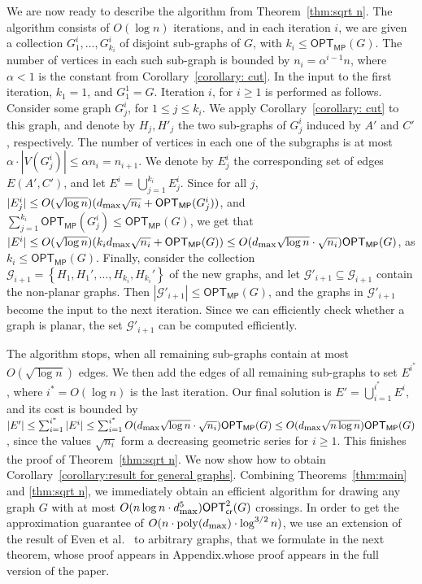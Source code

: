 \documentclass[twoside,leqno,twocolumn]{article}
\newcommand{\set}[1]{\left\{ #1 \right\}}
\newcommand{\sse}{\subseteq}
\newcommand{\gset}{{\mathcal{G}}}
\newcommand{\poly}{\operatorname{poly}}
\newcommand{\optmp}[1]{\mathsf{OPT}_{\mathsf{MP}}(#1)}
\newcommand{\optcrosq}[1]{\mathsf{OPT}^{2}_{\mathsf{cr}}(#1)}
\newcommand{\dmax}{d_{\mbox{\textup{\footnotesize{max}}}}}
\begin{document}
We are now ready to describe the algorithm from Theorem~\ref{thm:sqrt n}. The algorithm consists of $O(\log n)$ iterations, and in each iteration $i$, we are given a collection $G_1^i,\ldots,G_{k_i}^i$ of disjoint sub-graphs of $G$, with $k_i\leq \optmp{G}$. The number of vertices in each such sub-graph is bounded by $n_i=\alpha^{i-1}n$, where $\alpha<1$ is the constant from Corollary~\ref{corollary: cut}. In the input to the first iteration, $k_1=1$, and $G_1^1=G$.
Iteration $i$, for $i\geq 1$ is performed as follows. Consider some graph $G^i_j$, for $1\leq j\leq k_i$. We apply Corollary~\ref{corollary: cut} to this graph, and denote by $H_j,H'_j$ the two sub-graphs of $G^i_j$ induced by $A'$ and $C'$, respectively. The number of vertices in each one of the subgraphs is at most $\alpha\cdot |V(G^i_j)|\leq \alpha n_i=n_{i+1}$. We denote by $E^i_j$ the corresponding set of edges $E(A',C')$, and let $E^i=\bigcup_{j=1}^{k_i}E^i_j$. Since for all $j$, $|E^i_j|\leq O(\sqrt{\log n})(\dmax\sqrt {n_i}+\optmp{G^i_j})$, and $\sum_{j=1}^{k_i}\optmp{G^i_j}\leq \optmp{G}$, we get that $|E^i|\leq O(\sqrt{\log n})(k_i\dmax\sqrt{n_i}+\optmp{G})\leq O(\dmax\sqrt{\log n}\cdot \sqrt{n_i})\optmp{G}$, as $k_i\leq \optmp{G}$. Finally, consider the collection $\gset_{i+1}=\set{H_1,H_1',\ldots,H_{k_i},H_{k_i}'}$ of the new graphs, and let $\gset'_{i+1}\sse \gset_{i+1}$ contain the non-planar graphs. Then $|\gset'_{i+1}|\leq \optmp{G}$, and the graphs in $\gset'_{i+1}$ become the input to the next iteration. 
Since we can efficiently check whether a graph is planar, the set $\gset'_{i+1}$ can be computed efficiently.

The algorithm stops, when all remaining sub-graphs contain at most $O(\sqrt{\log n})$ edges. We then add the edges of all remaining sub-graphs to set $E^{i^*}$, where $i^*=O(\log n)$ is the last iteration. Our final solution is $E'=\bigcup_{i=1}^{i^*}E^i$, and its cost is bounded by $|E'|\leq \sum_{i=1}^{i^*}|E^i|\leq \sum_{i=1}^{i^*} O(\dmax\sqrt{\log n}\cdot \sqrt{n_i})\optmp{G}\leq O(\dmax\sqrt{n\log n})\optmp{G}$, since the values $\sqrt{n_i}$ form a decreasing geometric series for $i\geq 1$. This finishes the proof of Theorem~\ref{thm:sqrt n}.
We now show how to obtain Corollary~\ref{corollary:result for general graphs}. Combining Theorems~\ref{thm:main} and \ref{thm:sqrt n}, we immediately obtain an efficient algorithm for drawing any graph $G$ with at most $O(n\log n\cdot \dmax^5)\optcrosq{G}$ crossings. In order to get the approximation guarantee of $O(n \cdot\poly(\dmax)\cdot \log^{3/2}n)$, we use an extension of the result of Even et al.~\cite{EvenGS02} to arbitrary graphs, that we formulate in the next theorem, \iffull whose proof appears in Appendix.\fi \ifabstract whose proof appears in the full version of the paper.\fi
\end{document}
